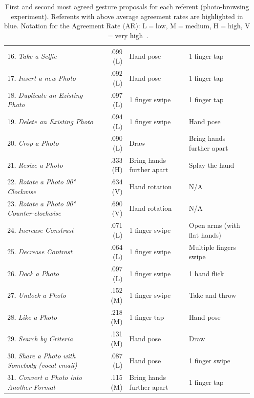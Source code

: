 \begin{table}[ht]
{\begin{tabular}{lrll}
        16. \textit{Take a Selfie} & .099 (L) & Hand pose & 1 finger tap\\
        17. \textit{Insert a new Photo} & .092 (L) & Hand pose & 1 finger tap\\
        18. \textit{Duplicate an Existing Photo} & .097 (L) & 1 finger swipe & 1 finger tap\\
        19. \textit{Delete an Existing Photo} & .094 (L) & 1 finger swipe & Hand pose\\
        20. \textit{Crop a Photo} & .090 (L) & Draw & Bring hands further apart\\
        21. \textit{Resize a Photo} & \cellcolor{graybluebrighter} .333 (H) & Bring hands further apart & Splay the hand\\
        22. \textit{Rotate a Photo 90° Clockwise} & \cellcolor{graybluebrighter} .634 (V) & Hand rotation & N/A\\
        23. \textit{Rotate a Photo 90° Counter-clockwise} & \cellcolor{graybluebrighter} .690 (V) & Hand rotation & N/A\\
        24. \textit{Increase Constrast} & .071 (L) & 1 finger swipe & Open arms (with flat hands)\\
        25. \textit{Decrease Contrast} & .064 (L) & 1 finger swipe & Multiple fingers swipe\\
        26. \textit{Dock a Photo} & .097 (L) & 1 finger swipe & 1 hand flick\\
        27. \textit{Undock a Photo} & .152 (M) & 1 finger swipe & Take and throw\\
        28. \textit{Like a Photo} & \cellcolor{graybluebrighter} .218 (M) & 1 finger tap & Hand pose\\
        29. \textit{Search by Criteria} & .131 (M) & Hand pose & Draw\\
        30. \textit{Share a Photo with Somebody (vocal email)} & .087 (L) & Hand pose & 1 finger swipe\\
        31. \textit{Convert a Photo into Another Format} & .115  (M) & Bring hands further apart & 1 finger tap\\
		\bottomrule
	\end{tabular}
	}
	\caption{First and second most agreed gesture proposals for each referent (photo-browsing experiment). Referents with above average agreement rates are highlighted in blue. Notation for the Agreement Rate (AR): L${=}$low, M${=}$medium, H${=}$high, V${=}$very high~\cite{Vatavu:2015}.}
	\label{tbl:lui-ges:agreement-photo}
	\vspace{-10pt}
\end{table}

